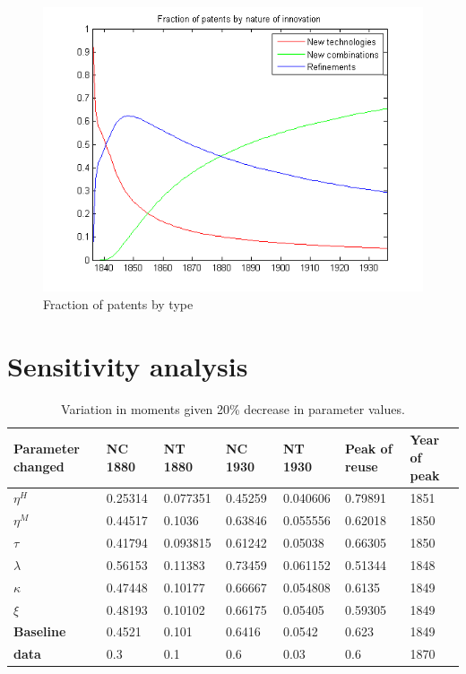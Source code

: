 \documentclass[a4paper,11pt]{article}
\begin{document}
\begin{figure}[h!]
\begin{center}
\includegraphics[scale=.8]{fractions_new.png}
\caption{Fraction of patents by type}
\end{center}
\end{figure}

\clearpage

\section*{Sensitivity analysis}

\begin{table}[h!]
\hspace*{-1cm}\begin{tabular}{lllllll}
\hline \hline
\textbf{Parameter changed}&\textbf{NC 1880}&\textbf{NT 1880}&\textbf{NC 1930}&\textbf{NT 1930}&\textbf{Peak of reuse} & \textbf{Year of peak}\\\hline
\textbf{$\eta^H$}&0.25314&0.077351&0.45259&0.040606&0.79891&1851\\\hline
\textbf{$\eta^M$}&0.44517&0.1036&0.63846&0.055556&0.62018&1850\\\hline
\textbf{$\tau$}&0.41794&0.093815&0.61242&0.05038&0.66305&1850\\\hline
\textbf{$\lambda$}&0.56153&0.11383&0.73459&0.061152&0.51344&1848\\\hline
\textbf{$\kappa$}&0.47448&0.10177&0.66667&0.054808&0.6135&1849\\\hline
\textbf{$\xi$}&0.48193&0.10102&0.66175&0.05405&0.59305&1849\\\hline
\textbf{Baseline}&0.4521&0.101&0.6416&0.0542&0.623&1849\\\hline
\textbf{data}&0.3&0.1&0.6&0.03&0.6&1870\\
\hline \hline
\end{tabular}
\caption{Variation in moments given 20\% decrease in parameter values.}
\end{table}
\end{document}
